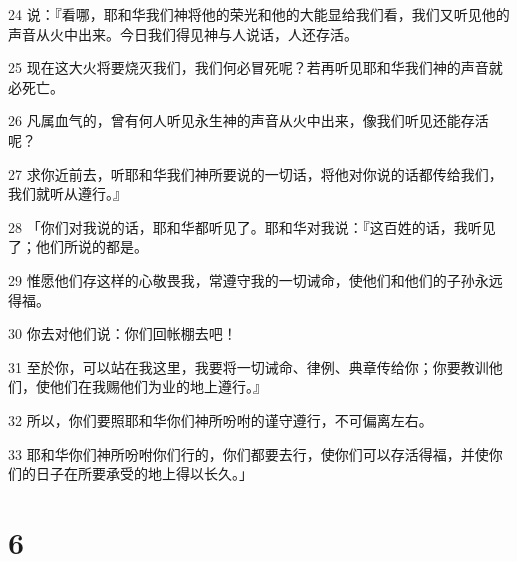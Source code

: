 \par 24 说：『看哪，耶和华我们神将他的荣光和他的大能显给我们看，我们又听见他的声音从火中出来。今日我们得见神与人说话，人还存活。
\par 25 现在这大火将要烧灭我们，我们何必冒死呢？若再听见耶和华我们神的声音就必死亡。
\par 26 凡属血气的，曾有何人听见永生神的声音从火中出来，像我们听见还能存活呢？
\par 27 求你近前去，听耶和华我们神所要说的一切话，将他对你说的话都传给我们，我们就听从遵行。』
\par 28 「你们对我说的话，耶和华都听见了。耶和华对我说：『这百姓的话，我听见了；他们所说的都是。
\par 29 惟愿他们存这样的心敬畏我，常遵守我的一切诫命，使他们和他们的子孙永远得福。
\par 30 你去对他们说：你们回帐棚去吧！
\par 31 至於你，可以站在我这里，我要将一切诫命、律例、典章传给你；你要教训他们，使他们在我赐他们为业的地上遵行。』
\par 32 所以，你们要照耶和华你们神所吩咐的谨守遵行，不可偏离左右。
\par 33 耶和华你们神所吩咐你们行的，你们都要去行，使你们可以存活得福，并使你们的日子在所要承受的地上得以长久。」

\chapter{6}

